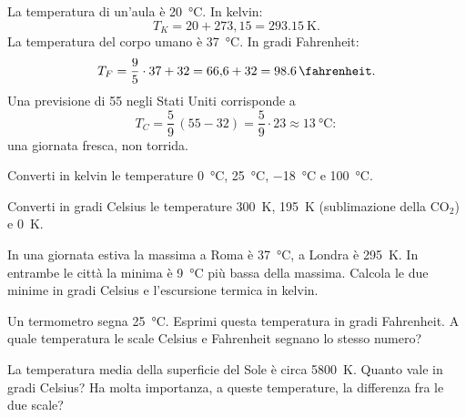 \begin{testexample}
La temperatura di un'aula è \SI{20}{\celsius}. In kelvin:
\[ T_K = 20 + 273{,}15 = \SI{293,15}{\kelvin}. \]
La temperatura del corpo umano è \SI{37}{\celsius}. In gradi Fahrenheit:
\[ T_F = \frac{9}{5}\cdot 37 + 32 = 66{,}6 + 32 = \SI{98,6}{\fahrenheit}. \]
Una previsione di \SI{55}{\fahrenheit} negli Stati Uniti corrisponde a
\[ T_C = \frac{5}{9}\,(55 - 32) = \frac{5}{9}\cdot 23 \approx \SI{13}{\celsius}: \]
una giornata fresca, non torrida.
\end{testexample}

\begin{esercizio}
Converti in kelvin le temperature \SI{0}{\celsius}, \SI{25}{\celsius}, \SI{-18}{\celsius} e \SI{100}{\celsius}.\\
\end{esercizio}

\begin{esercizio}
Converti in gradi Celsius le temperature \SI{300}{\kelvin}, \SI{195}{\kelvin} (sublimazione della CO$_2$) e \SI{0}{\kelvin}.\\
\end{esercizio}

\begin{esercizio}
In una giornata estiva la massima a Roma è \SI{37}{\celsius}, a Londra è \SI{295}{\kelvin}. In entrambe le città la minima è \SI{9}{\celsius} più bassa della massima. Calcola le due minime in gradi Celsius e l'escursione termica in kelvin.\\
\end{esercizio}

\begin{esercizio}
Un termometro segna \SI{25}{\celsius}. Esprimi questa temperatura in gradi Fahrenheit. A quale temperatura le scale Celsius e Fahrenheit segnano lo stesso numero?\\
\end{esercizio}

\begin{esercizio}
La temperatura media della superficie del Sole è circa \SI{5800}{\kelvin}. Quanto vale in gradi Celsius? Ha molta importanza, a queste temperature, la differenza fra le due scale?\\
\end{esercizio}

